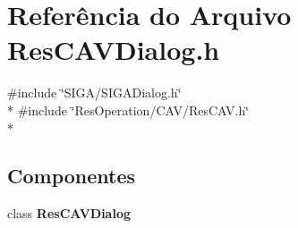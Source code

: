 \section{Referência do Arquivo Res\+C\+A\+V\+Dialog.\+h}
\label{_c_a_v_2_res_c_a_v_dialog_8h}
{\ttfamily \#include \char`\"{}S\+I\+G\+A/\+S\+I\+G\+A\+Dialog.\+h\char`\"{}}\\*
{\ttfamily \#include \char`\"{}Res\+Operation/\+C\+A\+V/\+Res\+C\+A\+V.\+h\char`\"{}}\\*
\subsection*{Componentes}
\begin{DoxyCompactItemize}
\item 
class {\bf Res\+C\+A\+V\+Dialog}
\end{DoxyCompactItemize}
